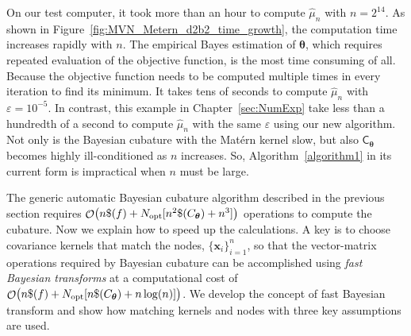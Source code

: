 \documentclass{iitthesis}          %
\DeclareMathOperator{\Order}{{\mathcal O}}
\newcommand{\bm}[1]{\boldsymbol{#1}}
\newcommand{\vtheta}{{\bm{\theta}}}
\newcommand{\vx}{\bm{x}}
\newcommand{\mC}{\mathsf{C}}
\newcommand{\hmu}{\widehat{\mu}}
\newcommand{\opt}{\textup{opt}}
\newcommand\figref{Figure~\ref}
\begin{document}
On our test computer, it took more than an hour to compute $\hmu_n$ with $n=2^{14}$. 
As shown in \figref{fig:MVN_Metern_d2b2_time_growth}, the computation time increases rapidly with $n$. 
The empirical Bayes estimation of $\vtheta$, which requires repeated evaluation of the objective function, is the most time consuming of all. Because the objective function needs to be computed multiple times in every iteration to find its minimum. It takes tens of seconds to compute $\hmu_n$ with $\varepsilon = 10^{-5}$.   In contrast, this example in Chapter~\ref{sec:NumExp} take less than a hundredth of a second to compute $\hmu_n$ with the same $\varepsilon$ using our new algorithm. Not only is the Bayesian cubature with the Mat\'ern kernel slow, but also $\mC_\vtheta$ becomes highly ill-conditioned as $n$ increases.
So, Algorithm~\ref{algorithm1} in its current form is impractical when $n$ must be large.









\label{sec:fast_BC}



The generic automatic Bayesian cubature algorithm described in the previous section requires $\Order\bigl(n \$(f) +  N_{\opt} [n^2 \$(C_\vtheta) + n^3]\bigr)$ operations to compute the cubature. Now we explain how to speed up the calculations. A key is to choose covariance kernels that match the nodes, $\{\vx_i\}_{i=1}^n$, so that the vector-matrix operations required by Bayesian cubature can be accomplished using \emph{fast Bayesian transforms} at a computational cost of $\Order\bigl(n \$(f) + N_{\opt} [n \$(C_\vtheta)  + n \log(n)] \bigr)$.
We develop the concept of fast Bayesian transform and show how matching kernels and nodes with three key assumptions are used. %
\end{document}
